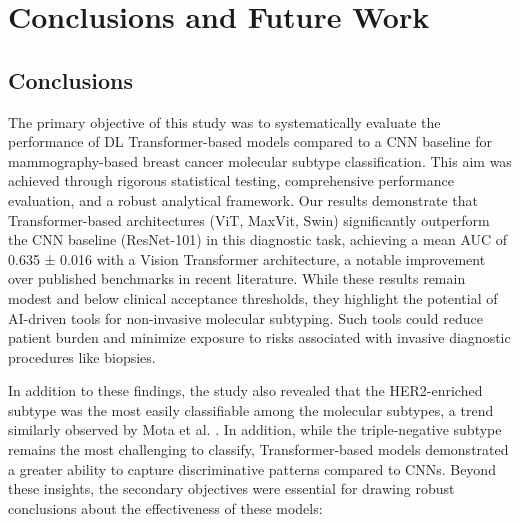 \documentclass[a4paper,10pt]{book}
\begin{document}
\chapter{Conclusions and Future Work}

\section{Conclusions}

The primary objective of this study was to systematically evaluate the performance of DL Transformer-based models compared to a CNN baseline for mammography-based breast cancer molecular subtype classification. This aim was achieved through rigorous statistical testing, comprehensive performance evaluation, and a robust analytical framework. Our results demonstrate that Transformer-based architectures (ViT, MaxVit, Swin) significantly outperform the CNN baseline (ResNet-101) in this diagnostic task, achieving a mean AUC of 0.635 ± 0.016 with a Vision Transformer architecture, a notable improvement over published benchmarks in recent literature. While these results remain modest and below clinical acceptance thresholds, they highlight the potential of AI-driven tools for non-invasive molecular subtyping. Such tools could reduce patient burden and minimize exposure to risks associated with invasive diagnostic procedures like biopsies.

In addition to these findings, the study also revealed that the HER2-enriched subtype was the most easily classifiable among the molecular subtypes, a trend similarly observed by Mota et al. \cite{mota_breast_2024}. In addition, while the triple-negative subtype remains the most challenging to classify, Transformer-based models demonstrated a greater ability to capture discriminative patterns compared to CNNs. Beyond these insights, the secondary objectives were essential for drawing robust conclusions about the effectiveness of these models:
\end{document}
